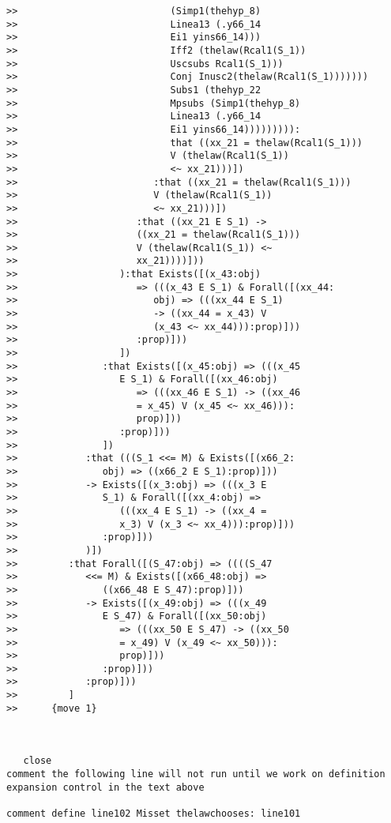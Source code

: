 \documentclass[12pt]{article}
\begin{document}
\begin{verbatim}
>>                           (Simp1(thehyp_8)
>>                           Linea13 (.y66_14
>>                           Ei1 yins66_14)))
>>                           Iff2 (thelaw(Rcal1(S_1))
>>                           Uscsubs Rcal1(S_1)))
>>                           Conj Inusc2(thelaw(Rcal1(S_1)))))))
>>                           Subs1 (thehyp_22
>>                           Mpsubs (Simp1(thehyp_8)
>>                           Linea13 (.y66_14
>>                           Ei1 yins66_14))))))))):
>>                           that ((xx_21 = thelaw(Rcal1(S_1)))
>>                           V (thelaw(Rcal1(S_1))
>>                           <~ xx_21)))])
>>                        :that ((xx_21 = thelaw(Rcal1(S_1)))
>>                        V (thelaw(Rcal1(S_1))
>>                        <~ xx_21)))])
>>                     :that ((xx_21 E S_1) ->
>>                     ((xx_21 = thelaw(Rcal1(S_1)))
>>                     V (thelaw(Rcal1(S_1)) <~
>>                     xx_21))))]))
>>                  ):that Exists([(x_43:obj)
>>                     => (((x_43 E S_1) & Forall([(xx_44:
>>                        obj) => (((xx_44 E S_1)
>>                        -> ((xx_44 = x_43) V
>>                        (x_43 <~ xx_44))):prop)]))
>>                     :prop)]))
>>                  ])
>>               :that Exists([(x_45:obj) => (((x_45
>>                  E S_1) & Forall([(xx_46:obj)
>>                     => (((xx_46 E S_1) -> ((xx_46
>>                     = x_45) V (x_45 <~ xx_46))):
>>                     prop)]))
>>                  :prop)]))
>>               ])
>>            :that (((S_1 <<= M) & Exists([(x66_2:
>>               obj) => ((x66_2 E S_1):prop)]))
>>            -> Exists([(x_3:obj) => (((x_3 E
>>               S_1) & Forall([(xx_4:obj) =>
>>                  (((xx_4 E S_1) -> ((xx_4 =
>>                  x_3) V (x_3 <~ xx_4))):prop)]))
>>               :prop)]))
>>            )])
>>         :that Forall([(S_47:obj) => ((((S_47
>>            <<= M) & Exists([(x66_48:obj) =>
>>               ((x66_48 E S_47):prop)]))
>>            -> Exists([(x_49:obj) => (((x_49
>>               E S_47) & Forall([(xx_50:obj)
>>                  => (((xx_50 E S_47) -> ((xx_50
>>                  = x_49) V (x_49 <~ xx_50))):
>>                  prop)]))
>>               :prop)]))
>>            :prop)]))
>>         ]
>>      {move 1}



   close
comment the following line will not run until we work on definition expansion control in the text above

comment define line102 Misset thelawchooses: line101

\end{verbatim}
\end{document}
